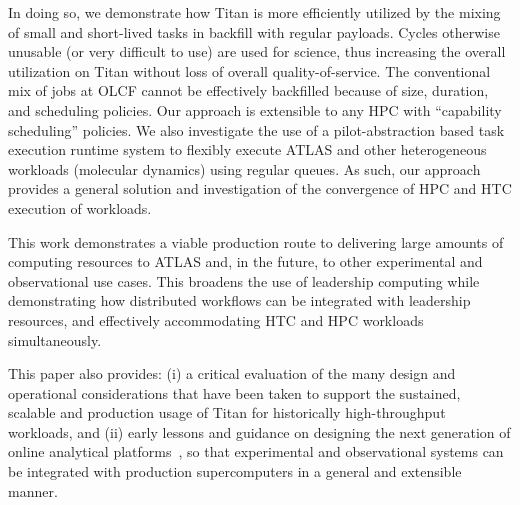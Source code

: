In doing so, we demonstrate how Titan is more efficiently utilized by the
mixing of small and short-lived tasks in backfill with regular payloads.
Cycles otherwise unusable (or very difficult to use) are used for science,
thus increasing the overall utilization on Titan without loss of overall
quality-of-service. The conventional mix of jobs at OLCF cannot be
effectively backfilled because of size, duration, and scheduling policies.
Our approach is extensible to any HPC with ``capability scheduling''
policies.  We also investigate the use of a pilot-abstraction based task
execution runtime system to flexibly execute ATLAS and other heterogeneous
workloads (molecular dynamics) using regular queues. As such, our approach
provides a general solution and investigation of the convergence of HPC and
HTC execution of workloads.

This work demonstrates a viable production route to delivering large amounts
of computing resources to ATLAS and, in the future, to other experimental and
observational use cases.  This broadens the use of leadership computing while
demonstrating how distributed workflows can be integrated with leadership
resources, and effectively accommodating HTC and HPC workloads
simultaneously.

This paper also provides: (i) a critical evaluation of the many design and
operational considerations that have been taken to support the sustained,
scalable and production usage of Titan for historically high-throughput
workloads, and (ii) early lessons and guidance on designing the next
generation of online analytical platforms~\cite{foap-url},  so that
experimental and observational systems can be integrated with production
supercomputers in a general and extensible manner.